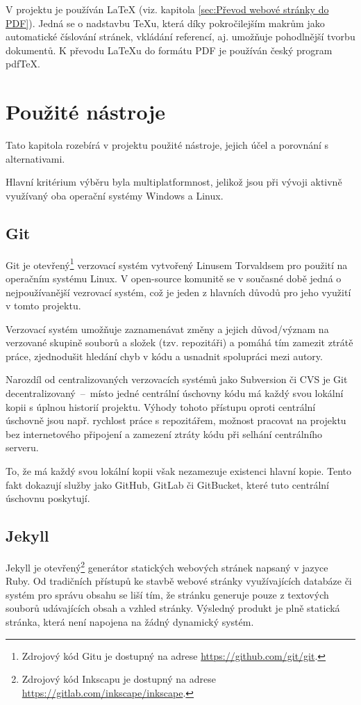 \documentclass[a4paper, 12pt]{article}
\begin{document}
  V projektu je používán \LaTeX{} (viz. kapitola \ref{sec:Převod webové stránky do PDF}). Jedná se o nadstavbu \TeX u, která díky pokročilejším makrům jako automatické číslování stránek, vkládání referencí, aj. umožňuje pohodlnější tvorbu dokumentů\cite{getting-started-with-latex}. K převodu \LaTeX u do formátu PDF je používán český program pdf\TeX{}\cite{pdftex}.


  \section{Použité nástroje} \label{sec:Použité nástroje}
  Tato kapitola rozebírá v projektu použité nástroje, jejich účel a porovnání s alternativami.

  Hlavní kritérium výběru byla multiplatformnost, jelikož jsou při vývoji aktivně využívaný oba operační systémy Windows a Linux.


  \subsection{Git} \label{sec:Git}
  Git je otevřený\footnote{Zdrojový kód Gitu je dostupný na adrese \url{https://github.com/git/git}.} verzovací systém vytvořený Linusem Torvaldsem pro použití na operačním systému Linux. V open-source komunitě se v současné době jedná o nejpoužívanější vezrovací systém\cite{version-control-usage-statistics}, což je jeden z hlavních důvodů pro jeho využití v tomto projektu.

  Verzovací systém umožňuje zaznamenávat změny a jejich důvod/význam na verzované skupině souborů a složek (tzv. repozitáři) a pomáhá tím zamezit ztrátě práce, zjednodušit hledání chyb v kódu a usnadnit spolupráci mezi autory.

  Narozdíl od centralizovaných verzovacích systémů jako Subversion či CVS je Git decentralizovaný~--~místo jedné centrální úschovny kódu má každý svou lokální kopii s úplnou historií projektu. Výhody tohoto přístupu oproti centrální úschovně jsou např. rychlost práce s repozitářem, možnost pracovat na projektu bez internetového připojení a zamezení ztráty kódu při selhání centrálního serveru\cite{cvcs-vs-dvcs}.

  To, že má každý svou lokální kopii však nezamezuje existenci hlavní kopie. Tento fakt dokazují služby jako GitHub, GitLab či GitBucket, které tuto centrální úschovnu poskytují. %


  \subsection{Jekyll} \label{sec:Jekyll}
  Jekyll je otevřený\footnote{Zdrojový kód Inkscapu je dostupný na adrese \url{https://gitlab.com/inkscape/inkscape}.} generátor statických webových stránek napsaný v jazyce Ruby. Od tradičních přístupů ke stavbě webové stránky využívajících databáze či systém pro správu obsahu se liší tím, že stránku generuje pouze z textových souborů udávajících obsah a vzhled stránky. Výsledný produkt je plně statická stránka, která není napojena na žádný dynamický systém.
\end{document}
